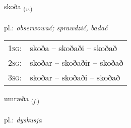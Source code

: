 \documentclass[frontgrid, backgrid]{flacards}\usepackage[]{graphicx}\usepackage[]{xcolor}
\begin{document}
\renewcommand{\blhead}{\vskip5pt {\small\bfseries\footnotesize Sagnorð | Verb }}
\renewcommand{\bcfoot}{\vskip5pt \hspace{2pt}{\small\bfseries\footnotesize 1K}}


{skoða \small{\textsubscript{(\textit{v.})}} \\[1ex] %
\textphonetic{[skɔːða]} \\
pl.: \emph{obserwować; sprawdzić, badać} \\  [2ex]
\renewcommand*{\arraystretch}{0.8}
\begin{tabular}{p{1cm}l}
\textsc{1sg}: & skoða -- skoðaði -- skoðað \\ 
\textsc{2sg}: & skoðar -- skoðaðir -- skoðað \\ 
\textsc{3sg}: & skoðar -- skoðaði -- skoðað \\ 
\end{tabular}
}

\renewcommand{\flhead}{\vskip5pt \fboxsep=0pt {\small\bfseries\footnotesize Nafnorð | Noun}}
\renewcommand{\fcfoot}{\vskip5pt \fboxsep=0pt \hspace{2pt}{\small\bfseries\footnotesize 1K}}

\renewcommand{\blhead}{\vskip5pt {\small\bfseries\footnotesize Nafnorð | Noun }}
\renewcommand{\bcfoot}{\vskip5pt \hspace{2pt}{\small\bfseries\footnotesize 1K}}


{umræða \small{\textsubscript{(\textit{f.})}} \\[1ex] %
\textphonetic{[ʏmraiða]} \\
pl.: \emph{dyskusja} \\  [2ex]
\renewcommand*{\arraystretch}{0.8}
}
\end{document}
